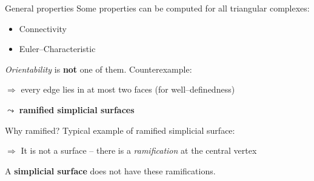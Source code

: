 \begin{frame}{General properties}
    \pause
    Some properties can be computed for all triangular complexes:
    \pause
    \begin{itemize}
        \item Connectivity
        \pause
        \item Euler--Characteristic
    \end{itemize}
    \pause
    \textit{Orientability} is \textbf{not} one of them.
    \pause
    Counterexample:
        \begin{center}
            \begin{tikzpicture}
                
	    \end{tikzpicture}
        \end{center}
    \pause
    $\Rightarrow$ every edge lies in at most two faces (for well--definedness)
    
    \pause
    $\leadsto$ \textbf{ramified simplicial surfaces}
\end{frame}


\begin{frame}{Why ramified?}
    \pause
    Typical example of ramified simplicial surface:
    \pause
    \begin{center}
        \begin{tikzpicture}
            
        \end{tikzpicture}
    \end{center}
    \pause
    $\Rightarrow$ It is not a surface -- there is a \textit{ramification} at 
        the central vertex
    
    \pause
    A \textbf{simplicial surface} does not have these ramifications.
\end{frame}


